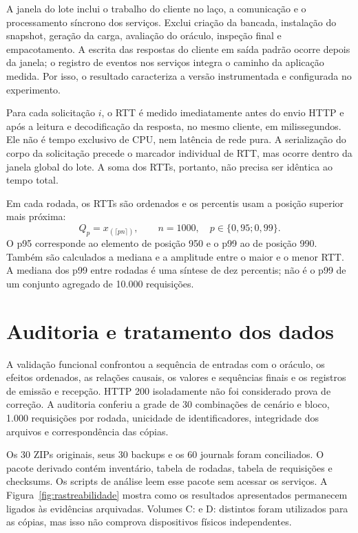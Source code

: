 A janela do lote inclui o trabalho do cliente no laço, a comunicação e o processamento síncrono dos serviços. Exclui criação da bancada, instalação do snapshot, geração da carga, avaliação do oráculo, inspeção final e empacotamento. A escrita das respostas do cliente em saída padrão ocorre depois da janela; o registro de eventos nos serviços integra o caminho da aplicação medida. Por isso, o resultado caracteriza a versão instrumentada e configurada no experimento.

Para cada solicitação $i$, o RTT é medido imediatamente antes do envio HTTP e após a leitura e decodificação da resposta, no mesmo cliente, em milissegundos. Ele não é tempo exclusivo de CPU, nem latência de rede pura. A serialização do corpo da solicitação precede o marcador individual de RTT, mas ocorre dentro da janela global do lote. A soma dos RTTs, portanto, não precisa ser idêntica ao tempo total.

Em cada rodada, os RTTs são ordenados e os percentis usam a posição superior mais próxima:
\begin{equation}
 Q_p=x_{(\lceil p n\rceil)},\qquad n=1000,\quad p\in\{0{,}95;0{,}99\}.
\end{equation}
O p95 corresponde ao elemento de posição 950 e o p99 ao de posição 990. Também são calculados a mediana e a amplitude entre o maior e o menor RTT. A mediana dos p99 entre rodadas é uma síntese de dez percentis; não é o p99 de um conjunto agregado de 10.000 requisições.

\section{Auditoria e tratamento dos dados}

A validação funcional confrontou a sequência de entradas com o oráculo, os efeitos ordenados, as relações causais, os valores e sequências finais e os registros de emissão e recepção. HTTP 200 isoladamente não foi considerado prova de correção. A auditoria conferiu a grade de 30 combinações de cenário e bloco, 1.000 requisições por rodada, unicidade de identificadores, integridade dos arquivos e correspondência das cópias.

Os 30 ZIPs originais, seus 30 backups e os 60 journals foram conciliados. O pacote derivado contém inventário, tabela de rodadas, tabela de requisições e checksums. Os scripts de análise leem esse pacote sem acessar os serviços. A Figura~\ref{fig:rastreabilidade} mostra como os resultados apresentados permanecem ligados às evidências arquivadas. Volumes C: e D: distintos foram utilizados para as cópias, mas isso não comprova dispositivos físicos independentes.

